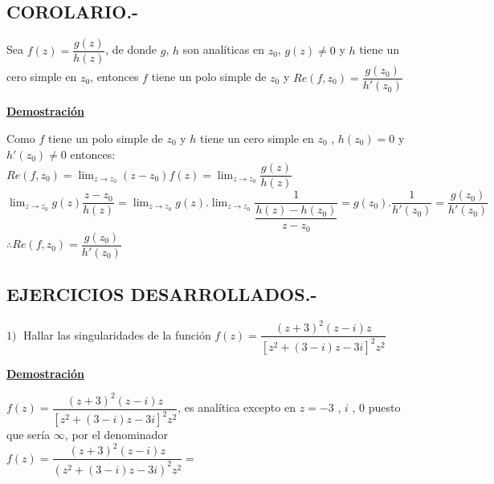 \documentclass[10pt,a4paper]{article}
\begin{document}
\subsection{COROLARIO.-} 
Sea $f(z) = \dfrac{g(z)}{h(z)}$, de donde $g$, $h$ son analíticas en $z_0$, $g(z) \neq 0$ y $h$ tiene un cero simple en $z_0$, entonces $f$ tiene un polo simple de $z_0$ y $Re(f,z_0) = \dfrac{g(z_0)}{h'(z_0)}$
\begin{center}
\textbf{\underline{Demostración}}
\end{center}
Como $f$ tiene un polo simple de $z_0$ y $h$ tiene un cero simple en $z_0$ , $h(z_0) = 0$ y $h'(z_0) \neq 0$ entonces: \\
$\displaystyle{Re(f,z_0) = \lim_{z \to z_0} (z-z_0) f(z) = \lim_{z \to z_0} \dfrac{g(z)}{h(z)}}$ \\
$\displaystyle{\lim_{z \to z_0} g(z) \dfrac{z-z_0}{h(z)} = \lim_{z \to z_0} g(z). \lim_{z \to z_0} \dfrac{1}{\dfrac{h(z) - h(z_0)}{z-z_0}} = g(z_0) . \dfrac{1}{h'(z_0)} = \dfrac{g(z_0)}{h'(z_0)}}$ \\
$\therefore Re(f,z_0) = \dfrac{g(z_0)}{h'(z_0)}$
\subsection{EJERCICIOS DESARROLLADOS.-}
$1) \; $ Hallar las singularidades de la función $f(z) = \dfrac{(z+3)^2(z-i) z}{[z^2 + (3 - i)z - 3i]^2 z^2}$ 
\begin{center}
\textbf{\underline{Demostración}}
\end{center}
 $f(z) = \dfrac{(z+3)^2(z-i) z}{[z^2 + (3 - i)z - 3i]^2 z^2}$, es analítica excepto en $z = -3$ , $i$ , $0$ puesto que sería $\infty$, por el denominador \\
 $f(z) = \dfrac{(z+3)^2(z-i) z}{(z^2 + (3 - i)z - 3i)^2 z^2} = $ 
\end{document}
